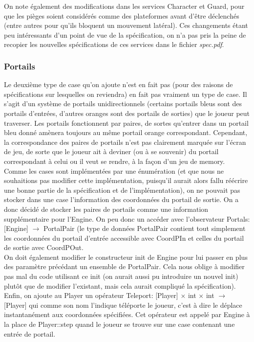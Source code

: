 \documentclass{article}
\begin{document}
On note également des modifications dans les services \textrm{Character} et \textrm{Guard}, pour que les pièges soient considérés comme des plateformes avant d'être déclenchés (entre autres pour qu'ils bloquent un mouvement latéral). Ces changements étant peu intéressants d'un point de vue de la spécification, on n'a pas pris la peine de recopier les nouvelles spécifications de ces services dans le fichier \textit{spec.pdf}.

\subsubsection{Portails}
Le deuxième type de case qu'on ajoute n'est en fait pas (pour des raisons de spécifications sur lesquelles on reviendra) en fait pas vraiment un type de case. Il s'agit d'un système de portails unidirectionnels (certains portails bleus sont des portails d'entrées, d'autres oranges sont des portails de sorties) que le joueur peut traverser. Les portails fonctionnent par paires, de sortes qu'entrer dans un portail bleu donné amènera toujours au même portail orange correspondant. Cependant, la correspondance des paires de portails n'est pas clairement marquée sur l'écran de jeu, de sorte que le joueur ait à deviner (ou à se souvenir) du portail correspondant à celui ou il veut se rendre, à la façon d'un jeu de memory.\\

Comme les cases sont implémentées par une énumération (et que nous ne souhaitions pas modifier cette implémentation, puisqu'il aurait alors fallu réécrire une bonne partie de la spécification et de l'implémentation), on ne pouvait pas stocker dans une case l'information des coordonnées du portail de sortie. On a donc décidé de stocker les paires de portails comme une information supplémentaire pour l'\textrm{Engine}. On peu donc un accéder avec l'observateur \textrm{Portals: [Engine] $\rightarrow$ PortalPair} (le type de données \textrm{PortalPair} contient tout simplement les coordonnées du portail d'entrée accessible avec \textrm{CoordPIn} et celles du portail de sortie avec \textrm{CoordPOut}.\\
On doit également modifier le constructeur \textrm{init} de \textrm{Engine} pour lui passer en plus des paramètre précédant un ensemble de \textrm{PortalPair}. Cela nous oblige à modifier pas mal du code utilisant ce \textrm{init} (on aurait aussi pu introduire un nouvel \textrm{init}) plutôt que de modifier l'existant, mais cela aurait compliqué la spécification).\\
Enfin, on ajoute au \textrm{Player} un opérateur \textrm{Teleport: [Player] $\times$ int $\times$ int $\rightarrow$ [Player]} qui comme son nom l'indique téléporte le joueur, c'est à dire le déplace instantanément aux coordonnées spécifiées. Cet opérateur est appelé par \textrm{Engine} à la place de \textrm{Player::step} quand le joueur se trouve sur une case contenant une entrée de portail.
\end{document}
